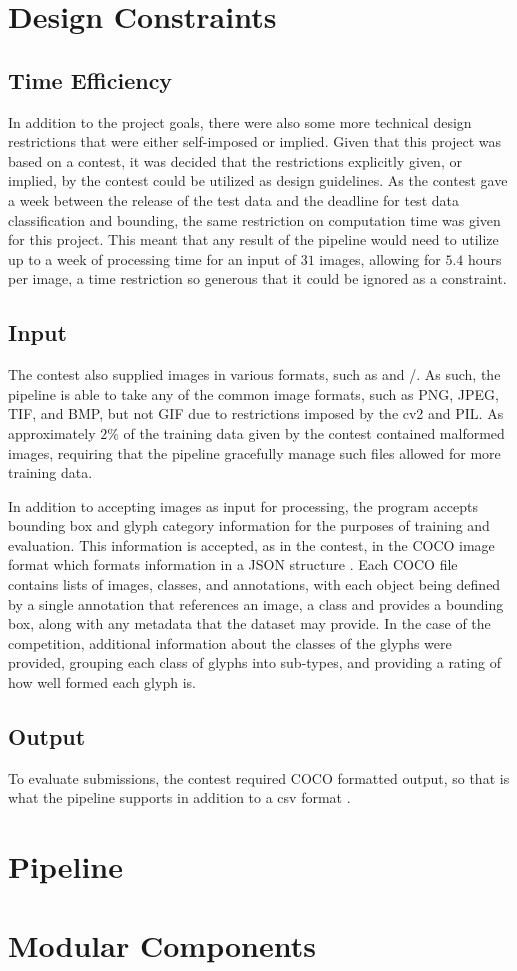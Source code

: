 \section{Design Constraints}

\subsection{Time Efficiency}

In addition to the project goals, there were also some more technical design restrictions that were either self-imposed or implied. Given that this project was based on a contest, it was decided that the restrictions explicitly given, or implied, by the contest could be utilized as design guidelines. As the contest gave a week between the release of the test data and the deadline for test data classification and bounding, the same restriction on computation time was given for this project. This meant that any result of the pipeline would need to utilize up to a week of processing time for an input of $31$ images, allowing for $5.4$ hours per image, a time restriction so generous that it could be ignored as a constraint.

\subsection{Input}

The contest also supplied images in various formats, such as  and /. As such, the pipeline is able to take any of the common image formats, such as PNG, JPEG, TIF, and BMP, but not GIF due to restrictions imposed by the cv2 and PIL. As approximately $2\%$ of the training data given by the contest contained malformed images, requiring that the pipeline gracefully manage such files allowed for more training data.

In addition to accepting images as input for processing, the program accepts bounding box and glyph category information for the purposes of training and evaluation. This information is accepted, as in the contest, in the COCO image format which formats information in a JSON structure . Each COCO file contains lists of images, classes, and annotations, with each object being defined by a single annotation that references an image, a class and provides a bounding box, along with any metadata that the dataset may provide. In the case of the competition, additional information about the classes of the glyphs were provided, grouping each class of glyphs into sub-types, and providing a rating of how well formed each glyph is.

\subsection{Output}

To evaluate submissions, the contest required COCO formatted output, so that is what the pipeline supports in addition to a csv format .

\section{Pipeline}
\todo{}

\section{Modular Components}
\todo{}
